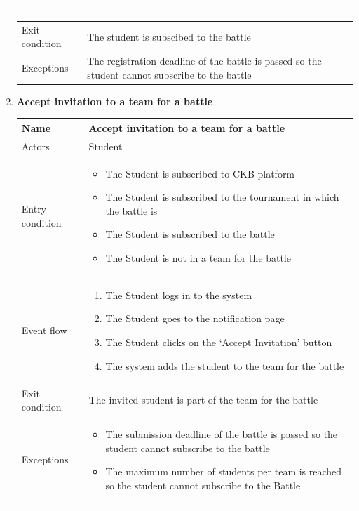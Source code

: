 \begin{enumerate}[label=UC\arabic*:]
\begin{tabular}{|p{3cm}|p{8cm}|}
\begin{enumerate}[label=\arabic*.]
        \end{enumerate} \\
        \hline
        Exit condition & The student is subscibed to the battle \\
        \hline
        Exceptions & The registration deadline of the battle is passed so the student cannot subscribe to the battle \\
        \hline
    \end{tabular}
    \item \textbf{Accept invitation to a team for a battle} \\
    \begin{tabular}{|p{3cm}|p{8cm}|}
        \hline
        Name & Accept invitation to a team for a battle \\
        \hline
        Actors & Student \\
        \hline
        Entry condition &
        \begin{itemize}
            \item The Student is subscribed to CKB platform
            \item The Student is subscribed to the tournament in which the battle is
            \item The Student is subscribed to the battle
            \item The Student is not in a team for the battle
        \end{itemize} \\
        \hline
        Event flow &
        \begin{enumerate}[label=\arabic*.]
            \item The Student logs in to the system
            \item The Student goes to the notification page
            \item The Student clicks on the `Accept Invitation' button
            \item The system adds the student to the team for the battle
        \end{enumerate} \\
        \hline
        Exit condition & The invited student is part of the team for the battle \\
        \hline
        Exceptions &
        \begin{itemize}
            \item The submission deadline of the battle is passed so the student cannot subscribe to the battle
            \item The maximum number of students per team is reached so the student cannot subscribe to the Battle

\end{itemize}
\end{tabular}
\end{enumerate}
